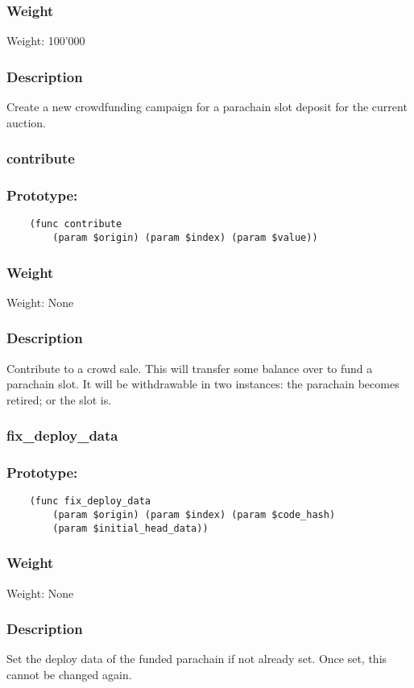 \documentclass[11pt,a4paper]{article}
\begin{document}
\subsubsection*{Weight}
Weight: 100'000
\subsubsection*{Description}
Create a new crowdfunding campaign for a parachain slot deposit for the current auction. 

\subsubsection{contribute}
\subsubsection*{Prototype:}
\begin{verbatim}
    (func contribute
        (param $origin) (param $index) (param $value))
\end{verbatim}
\subsubsection*{Weight}
Weight: None
\subsubsection*{Description}
Contribute to a crowd sale. This will transfer some balance over to fund a parachain slot. It will be withdrawable in two instances: the parachain becomes retired; or the slot is.

\subsubsection{fix\_deploy\_data}
\subsubsection*{Prototype:}
\begin{verbatim}
    (func fix_deploy_data
        (param $origin) (param $index) (param $code_hash)
        (param $initial_head_data))
\end{verbatim}
\subsubsection*{Weight}
Weight: None
\subsubsection*{Description}
Set the deploy data of the funded parachain if not already set. Once set, this cannot be changed again.
\end{document}
